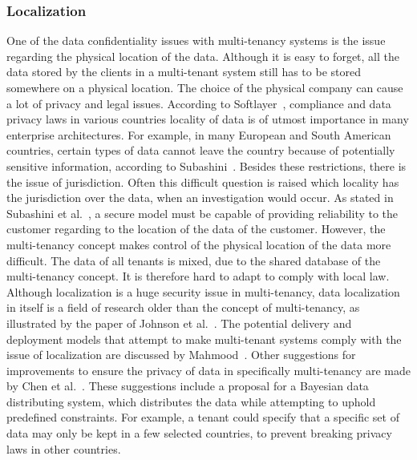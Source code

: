 \subsubsection{Localization}
One of the data confidentiality issues with multi-tenancy systems is the issue regarding the physical location of the data. 
Although it is easy to forget, all the data stored by the clients in a multi-tenant system still has to be stored somewhere on a physical location. 
The choice of the physical company can cause a lot of privacy and legal issues. 
According to Softlayer~\cite{Softlayer2009Security}, compliance and data privacy laws in various countries locality of data is of utmost importance in many enterprise architectures. 
For example, in many European and South American countries, certain types of data cannot leave the country because of potentially sensitive information, according to Subashini~\cite{Subashini2011Security}.
Besides these restrictions, there is the issue of jurisdiction.
Often this difficult question is raised which locality has the jurisdiction over the data, when an investigation would occur.
As stated in Subashini et al.~\cite{Subashini2011Security}, a secure model must be capable of providing reliability to the customer regarding to the location of the data of the customer.
However, the multi-tenancy concept makes control of the physical location of the data more difficult. 
The data of all tenants is mixed, due to the shared database of the multi-tenancy concept. 
It is therefore hard to adapt to comply with local law.\\

Although localization is a huge security issue in multi-tenancy, data localization in itself is a field of research older than the concept of multi-tenancy, as illustrated by the paper of Johnson et al.~\cite{Johnson1996Law}. 
The potential delivery and deployment models that attempt to make multi-tenant systems comply with the issue of localization are discussed by Mahmood~\cite{Mahmood2011Security}.
Other suggestions for improvements to ensure the privacy of data in specifically multi-tenancy are made by Chen et al.~\cite{Chen2012Security}. These suggestions include a proposal for a Bayesian data distributing system, which distributes the data while attempting to uphold predefined constraints. For example, a tenant could specify that a specific set of data may only be kept in a few selected countries, to prevent breaking privacy laws in other countries. 

